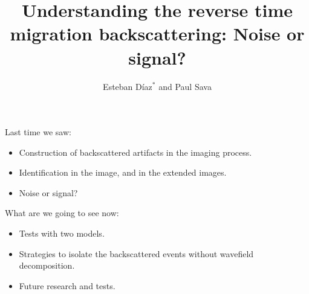 



\title[]{Understanding the reverse time migration backscattering:
Noise or signal?}
\subtitle{}
\author[]{Esteban  D\'{i}az$^{*}$ and Paul Sava}
\date{}
\logo{}

\def\big#1{\begin{center} \LARGE \textbf{#1} \end{center}}
\def\cen#1{\begin{center}        \textbf{#1} \end{center}}

 { \cwpcover }



\begin{frame}
Last time we saw:
	\begin{itemize}
		\item Construction of backscattered artifacts in the imaging process. 
		\item Identification in the image, and in the extended images.
		\item Noise or signal? 
	\end{itemize}
\end{frame}

\begin{frame}
What are we going to see now:
	\begin{itemize}
		\item Tests with two models.   
		\item Strategies to isolate the backscattered events without wavefield decomposition.
		\item Future research and tests.
	\end{itemize}
\end{frame}

\begin{frame}\end{frame}
\begin{frame}\end{frame}




